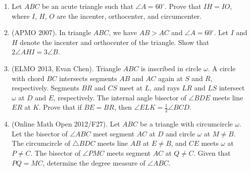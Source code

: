 \documentclass[11pt]{scrartcl}
\begin{document}
\begin{enumerate}[resume]

\item Let $ABC$ be an acute triangle such that $\angle A = 60^\circ$. Prove that $IH = IO$, where $I$, $H$, $O$ are the incenter, orthocenter, and circumcenter.

\item (APMO 2007). In triangle $ABC$, we have $AB > AC$ and $\angle A = 60^\circ$. Let $I$ and $H$ denote the incenter and orthocenter of the triangle. Show that $2\angle AHI = 3\angle B$.

\item (ELMO 2013, Evan Chen). Triangle $ABC$ is inscribed in circle $\omega$. A circle with chord $BC$ intersects segments $AB$ and $AC$ again at $S$ and $R$, respectively. Segments $BR$ and $CS$ meet at $L$, and rays $LR$ and $LS$ intersect $\omega$ at $D$ and $E$, respectively. The internal angle bisector of $\angle BDE$ meets line $ER$ at $K$. Prove that if $BE = BR$, then $\angle ELK = \frac{1}{2}\angle BCD$.

\item (Online Math Open 2012/F27). Let $ABC$ be a triangle with circumcircle $\omega$. Let the bisector of $\angle ABC$ meet segment $AC$ at $D$ and circle $\omega$ at $M \neq B$. The circumcircle of $\triangle BDC$ meets line $AB$ at $E \neq B$, and $CE$ meets $\omega$ at $P \neq C$. The bisector of $\angle PMC$ meets segment $AC$ at $Q \neq C$. Given that $PQ = MC$, determine the degree measure of $\angle ABC$.
\end{enumerate}
\end{document}
